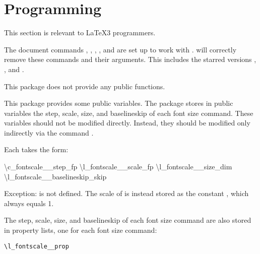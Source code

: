 \documentclass{beery}
\begin{document}
\section{Programming}
\label{sec:programming}

This section is relevant to \LaTeX3 programmers.

The document commands , , , , and  are set up to work with .
 will correctly remove these commands and their arguments.
This includes the starred versions , , and .

This package does not provide any public  functions.

This package provides some public  variables.
The package stores in public variables the step, scale, size, and baselineskip of each font size command.
These variables should not be modified directly.
Instead, they should be modified only indirectly via the command .

Each takes the form:

\begingroup
  \ttfamily
  \textbackslash{}c\_fontscale\_\_step\_fp
  \nopagebreak\newline
  \textbackslash{}l\_fontscale\_\_scale\_fp
  \newline
  \textbackslash{}l\_fontscale\_\_size\_dim
  \nopagebreak\newline
  \textbackslash{}l\_fontscale\_\_baselineskip\_skip
\endgroup

Exception:
 is not defined.
The scale of  is instead stored as the constant , which always equals \num{1}.

The step, scale, size, and baselineskip of each font size command are also stored in property lists, one for each font size command:

\texttt{\textbackslash{}l\_fontscale\_\_prop}
\end{document}
